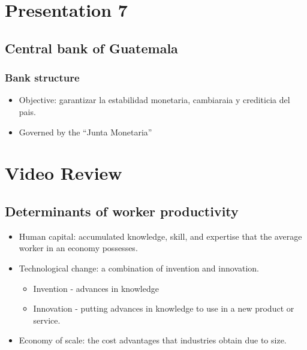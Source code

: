 \documentclass[openany]{book}
\begin{document}
\chapter{Presentation 7}
\section{Central bank of Guatemala}
\subsection{Bank structure}
\begin{itemize}
    \item Objective: garantizar la estabilidad monetaria, cambiaraia y crediticia del pais.
    \item Governed by the ``Junta Monetaria''
\end{itemize}


\chapter{Video Review}
\section{Determinants of worker productivity} 
\begin{itemize}
    \item Human capital: accumulated knowledge, skill, and expertise that the average worker in an economy possesses. 
    \item Technological change: a combination of invention and innovation.
        \begin{itemize}
            \item Invention - advances in knowledge 
            \item Innovation - putting advances in knowledge to use in a new product or service.
        \end{itemize}
    \item Economy of scale: the cost advantages that industries obtain due to size. 
\end{itemize}
\end{document}
